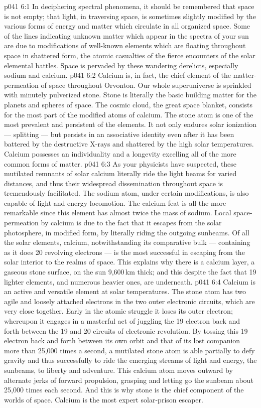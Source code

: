 \vs p041 6:1 In deciphering spectral phenomena, it should be remembered that space is not empty; that light, in traversing space, is sometimes slightly modified by the various forms of energy and matter which circulate in all organized space. Some of the lines indicating unknown matter which appear in the spectra of your sun are due to modifications of well\hyp{}known elements which are floating throughout space in shattered form, the atomic casualties of the fierce encounters of the solar elemental battles. Space is pervaded by these wandering derelicts, especially sodium and calcium.
\vs p041 6:2 Calcium is, in fact, the chief element of the matter\hyp{}permeation of space throughout Orvonton. Our whole superuniverse is sprinkled with minutely pulverized stone. Stone is literally the basic building matter for the planets and spheres of space. The cosmic cloud, the great space blanket, consists for the most part of the modified atoms of calcium. The stone atom is one of the most prevalent and persistent of the elements. It not only endures solar ionization --- splitting --- but persists in an associative identity even after it has been battered by the destructive X\hyp{}rays and shattered by the high solar temperatures. Calcium possesses an individuality and a longevity excelling all of the more common forms of matter.
\vs p041 6:3 \pc As your physicists have suspected, these mutilated remnants of solar calcium literally ride the light beams for varied distances, and thus their widespread dissemination throughout space is tremendously facilitated. The sodium atom, under certain modifications, is also capable of light and energy locomotion. The calcium feat is all the more remarkable since this element has almost twice the mass of sodium. Local space\hyp{}permeation by calcium is due to the fact that it escapes from the solar photosphere, in modified form, by literally riding the outgoing sunbeams. Of all the solar elements, calcium, notwithstanding its comparative bulk --- containing as it does 20 revolving electrons --- is the most successful in escaping from the solar interior to the realms of space. This explains why there is a calcium layer, a gaseous stone surface, on the sun 9,600\,km thick; and this despite the fact that 19 lighter elements, and numerous heavier ones, are underneath.
\vs p041 6:4 Calcium is an active and versatile element at solar temperatures. The stone atom has two agile and loosely attached electrons in the two outer electronic circuits, which are very close together. Early in the atomic struggle it loses its outer electron; whereupon it engages in a masterful act of juggling the 19 electron back and forth between the 19 and 20 circuits of electronic revolution. By tossing this 19 electron back and forth between its own orbit and that of its lost companion more than 25,000 times a second, a mutilated stone atom is able partially to defy gravity and thus successfully to ride the emerging streams of light and energy, the sunbeams, to liberty and adventure. This calcium atom moves outward by alternate jerks of forward propulsion, grasping and letting go the sunbeam about 25,000 times each second. And this is why stone is the chief component of the worlds of space. Calcium is the most expert solar\hyp{}prison escaper.
